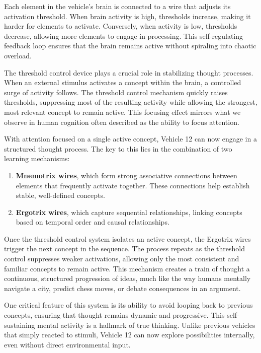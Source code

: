 \documentclass{article}
\begin{document}
	Each element in the vehicle's brain is connected to a wire that adjusts its activation threshold. When brain activity is high, thresholds increase, making it harder for elements to activate. Conversely, when activity is low, thresholds decrease, allowing more elements to engage in processing. This self-regulating feedback loop ensures that the brain remains active without spiraling into chaotic overload.  

	The threshold control device plays a crucial role in stabilizing thought processes. When an external stimulus activates a concept within the brain, a controlled surge of activity follows. The threshold control mechanism quickly raises thresholds, suppressing most of the resulting activity while allowing the strongest, most relevant concept to remain active. This focusing effect mirrors what we observe in human cognition often described as the ability to focus attention.

	With attention focused on a single active concept, Vehicle 12 can now engage in a structured thought process. The key to this lies in the combination of two learning mechanisms:  


	\begin{enumerate}
		\item \textbf{Mnemotrix wires}, which form strong associative connections between elements that frequently activate together. These connections help establish stable, well-defined concepts.
		\item \textbf{Ergotrix wires}, which capture sequential relationships, linking concepts based on temporal order and causal relationships. 
	\end{enumerate}

	Once the threshold control system isolates an active concept, the Ergotrix wires trigger the next concept in the sequence. The process repeats as the threshold control suppresses weaker activations, allowing only the most consistent and familiar concepts to remain active. This mechanism creates a train of thought a continuous, structured progression of ideas, much like the way humans mentally navigate a city, predict chess moves, or debate consequences in an argument.  

	One critical feature of this system is its ability to avoid looping back to previous concepts, ensuring that thought remains dynamic and progressive. This self-sustaining mental activity is a hallmark of true thinking. Unlike previous vehicles that simply reacted to stimuli, Vehicle 12 can now explore possibilities internally, even without direct environmental input.  
\end{document}

